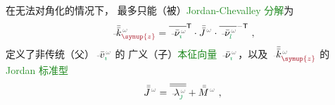 在无法对角化的情况下， 最多只能（被）\textcolor{ForestGreen}{Jordan-Chevalley 分解}为
\begin{align} \label{eq:kz-Jordan_decompose}
	\Xint{\begin{smallmatrix} ~ \\ {}^{}_{\mathcolor{gray}{-}} \\ ~ \end{smallmatrix}}{15}{\bar{\bar{k}}}_{\textcolor{Maroon}{\symup{z}}}^{\;\! \mathcolor{gray}{\omega}} = \overline{\Xint{\begin{smallmatrix} ~ \\ {}^{}_{\mathcolor{gray}{-}} \\ ~ \end{smallmatrix}}{15}{\bar{\nu}}^{\;\!\mathcolor{gray}{\omega}}_{\textcolor{ForestGreen}{\imath}}}^\mathsf{T} \cdot \bar{\bar{J}}^{\;\!\mathcolor{gray}{\omega}} \cdot \overline{\Xint{\begin{smallmatrix} ~ \\ {}^{}_{\mathcolor{gray}{-}} \\ ~ \end{smallmatrix}}{15}{\bar{\nu}}^{\;\!\mathcolor{gray}{\omega}}_{\textcolor{ForestGreen}{l}}}^{-\mathsf{T}} ~,
\end{align}
定义了非传统（父）$\Xint{\begin{smallmatrix} ~ \\ {}^{}_{\mathcolor{gray}{-}} \\ ~ \end{smallmatrix}}{15}{\bar{v}}^{\;\!\mathcolor{gray}{\omega}}_{\textcolor{ForestGreen}{\imath}}$ 的 广义（子）\textcolor{ForestGreen}{本征向量} $\Xint{\begin{smallmatrix} ~ \\ {}^{}_{\mathcolor{gray}{-}} \\ ~ \end{smallmatrix}}{15}{\bar{\nu}}^{\;\!\mathcolor{gray}{\omega}}_{\textcolor{ForestGreen}{\imath}}$，以及 $\Xint{\begin{smallmatrix} ~ \\ {}^{}_{\mathcolor{gray}{-}} \\ ~ \end{smallmatrix}}{15}{\bar{\bar{k}}}_{\textcolor{Maroon}{\symup{z}}}^{\;\! \mathcolor{gray}{\omega}}$ 的 \textcolor{ForestGreen}{Jordan 标准型}
\begin{align} \label{eq:kz-Jordan_normal_form}
	\bar{\bar{J}}^{\;\!\mathcolor{gray}{\omega}} = \overline{\overline{\Xint{\begin{smallmatrix} ~ \\ {}^{}_{\mathcolor{gray}{-}} \\ ~ \end{smallmatrix}}{22}{\lambda}^{\;\!\mathcolor{gray}{\omega}}_{\textcolor{ForestGreen}{\jmath}}}} + \bar{\bar{M}}^{\;\!\mathcolor{gray}{\omega}} ~,
\end{align}
